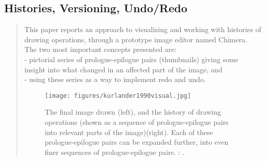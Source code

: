 

% 
% 


\subsection{Histories, Versioning, Undo/Redo} 

		\begin{quote}
		\small
		This paper reports an approach to visualizing and working with histories of drawing operations,
		through a prototype image editor named Chimera.
		The two most important concepts presented are:\\
		- pictorial series of prologue-epilogue pairs (thumbnails) giving some insight into
		what changed in an affected part of the image, and\\
		- using these series as a way to implement redo and undo.
		\begin{figure}[htb]
		\centering
		\texttt{[image: figures/kurlander1990visual.jpg]}
		\caption{
		The final image drawn (left), and the history of drawing operations (shown as
		a sequence of prologue-epilogue pairs into relevant parts of the image)(right).
		Each of these prologue-epilogue pairs can be expanded further, into even finer
		sequences of prologue-epilogue pairs.
		\citeauthor{kurlander1990visual}: 
		\cite{kurlander1990visual}.}
		\label{fig:kurlander1990visual}
		\end{figure}
				
		\end{quote}

